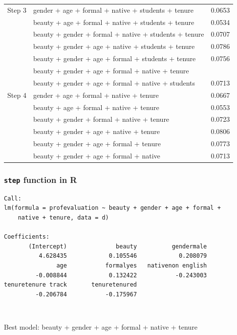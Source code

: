 \begin{frame}[shrink]
{\begin{tabular}{l | l | c}
\hline
Step 3	& gender + age + formal + native + students + tenure 					& 0.0653 \\
		& beauty + age + formal + native + students + tenure					& 0.0534 \\
		& beauty + gender + formal + native + students + tenure					& 0.0707 \\
		& beauty + gender + age + native + students + tenure					& 0.0786 \\
		& beauty + gender + age + formal + students + tenure					& 0.0756 \\
		& beauty + gender + age + formal + native + tenure						& \orange{0.0855} \\
		& beauty + gender + age + formal + native + students					& 0.0713 \pause \\
\hline
Step 4	& gender + age + formal + native + tenure 							& 0.0667 \\
		& beauty + age + formal + native + tenure								& 0.0553 \\
		& beauty + gender + formal + native + tenure							& 0.0723 \\
		& beauty + gender + age + native + tenure							& 0.0806 \\
		& beauty + gender + age + formal + tenure							& 0.0773 \\
		& beauty + gender + age + formal + native							& 0.0713 \\
\end{tabular}
}

\end{frame}


\begin{frame}[fragile]
\frametitle{\texttt{step} function in R}

{\scriptsize
\begin{verbatim}
Call:
lm(formula = profevaluation ~ beauty + gender + age + formal + 
    native + tenure, data = d)

Coefficients:
       (Intercept)              beauty          gendermale  
          4.628435            0.105546            0.208079  
               age           formalyes   nativenon english  
         -0.008844            0.132422           -0.243003  
tenuretenure track       tenuretenured  
         -0.206784           -0.175967  
\end{verbatim}
}

$\:$

\pause
Best model: beauty + gender + age + formal + native + tenure

\end{frame}

